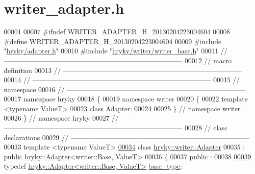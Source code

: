 \hypertarget{writer__adapter_8h_source}{\section{writer\-\_\-adapter.\-h}
}

\begin{DoxyCode}
00001 
00007 \textcolor{preprocessor}{#ifndef WRITER\_ADAPTER\_H\_20130204223004604}
00008 \textcolor{preprocessor}{}\textcolor{preprocessor}{#define WRITER\_ADAPTER\_H\_20130204223004604}
00009 \textcolor{preprocessor}{}\textcolor{preprocessor}{#include "\hyperlink{adapter_8h}{hryky/adapter.h}"}
00010 \textcolor{preprocessor}{#include "\hyperlink{writer__base_8h}{hryky/writer/writer_base.h}"}
00011 \textcolor{comment}{//
      ------------------------------------------------------------------------------}
00012 \textcolor{comment}{// macro definition}
00013 \textcolor{comment}{//
      ------------------------------------------------------------------------------}
00014 \textcolor{comment}{//
      ------------------------------------------------------------------------------}
00015 \textcolor{comment}{// namespace}
00016 \textcolor{comment}{//
      ------------------------------------------------------------------------------}
00017 \textcolor{keyword}{namespace }hryky
00018 \{
00019 \textcolor{keyword}{namespace }writer
00020 \{
00022     \textcolor{keyword}{template} <\textcolor{keyword}{typename} ValueT>
00023     \textcolor{keyword}{class }Adapter;
00024 
00025 \} \textcolor{comment}{// namespace writer}
00026 \} \textcolor{comment}{// namespace hryky}
00027 \textcolor{comment}{//
      ------------------------------------------------------------------------------}
00028 \textcolor{comment}{// class declarations}
00029 \textcolor{comment}{//
      ------------------------------------------------------------------------------}
00033 \textcolor{comment}{}\textcolor{keyword}{template} <\textcolor{keyword}{typename} ValueT>
\hypertarget{writer__adapter_8h_source_l00034}{}\hyperlink{classhryky_1_1writer_1_1_adapter}{00034} \textcolor{keyword}{class }\hyperlink{classhryky_1_1writer_1_1_adapter}{hryky::writer::Adapter}
00035     : \textcolor{keyword}{public} \hyperlink{classhryky_1_1_adapter}{hryky::Adapter}<writer::Base, ValueT>
00036 \{
00037 \textcolor{keyword}{public} :
00038 
\hypertarget{writer__adapter_8h_source_l00039}{}\hyperlink{classhryky_1_1writer_1_1_adapter_a404ee40bd08ea08673f7e134625ef904}{00039}     \textcolor{keyword}{typedef} \hyperlink{classhryky_1_1_adapter}{hryky::Adapter<writer::Base, ValueT>} \hyperlink{classhryky_1_1writer_1_1_adapter_a404ee40bd08ea08673f7e134625ef904}{base_type};

\end{DoxyCode}

